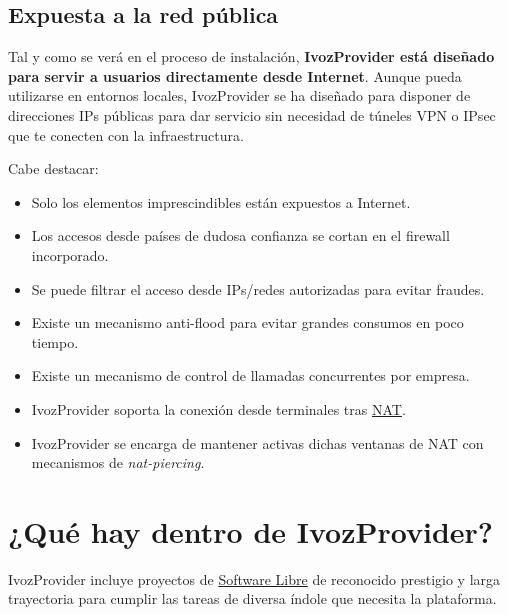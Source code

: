 \documentclass[letterpaper,10pt,spanish]{sphinxmanual}
\begin{document}
\subsection{Expuesta a la red pública}
\label{intro/what_is_ivozprovider:expuesta-a-la-red-publica}\label{intro/what_is_ivozprovider:exposed}
Tal y como se verá en el proceso de instalación, \textbf{IvozProvider está diseñado para servir a usuarios directamente desde Internet}. Aunque pueda utilizarse en entornos locales, IvozProvider se ha diseñado para disponer de direcciones IPs públicas para dar servicio sin necesidad de túneles VPN o IPsec que te conecten con la infraestructura.

Cabe destacar:
\begin{itemize}
\item {} 
Solo los elementos imprescindibles están expuestos a Internet.

\item {} 
Los accesos desde países de dudosa confianza se cortan en el firewall incorporado.

\item {} 
Se puede filtrar el acceso desde IPs/redes autorizadas para evitar fraudes.

\item {} 
Existe un mecanismo anti-flood para evitar grandes consumos en poco tiempo.

\item {} 
Existe un mecanismo de control de llamadas concurrentes por empresa.

\item {} 
IvozProvider soporta la conexión desde terminales tras \href{https://es.wikipedia.org/wiki/Traducci\%C3\%B3n\_de\_direcciones\_de\_red}{NAT}.

\item {} 
IvozProvider se encarga de mantener activas dichas ventanas de NAT con mecanismos de \emph{nat-piercing}.

\end{itemize}


\section{¿Qué hay dentro de IvozProvider?}
\label{intro/what_is_inside:que-hay-dentro-de-ivozprovider}\label{intro/what_is_inside::doc}
IvozProvider incluye proyectos de \href{https://www.gnu.org/philosophy/free-sw.es.html}{Software Libre} de reconocido prestigio y larga trayectoria para cumplir las tareas de diversa índole que necesita la plataforma.
\end{document}
